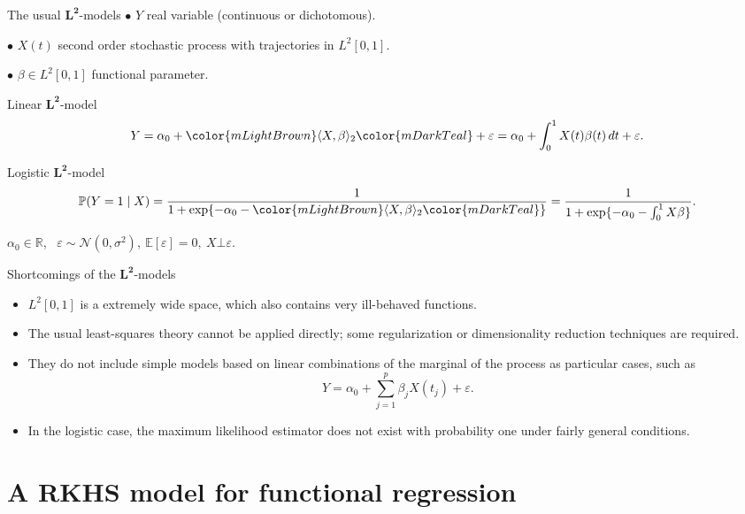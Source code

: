 \documentclass[10pt, english, professionalfonts]{beamer}
\newcommand\maroon[1]{\color{mLightBrown}#1\color{mDarkTeal}}
\begin{document}
\begin{frame}{The usual \(\bm{L^2}\)-models}
  \(\bullet\) \(Y\) real variable (continuous or dichotomous).

  \(\bullet\) \(X(t)\) second order stochastic process with trajectories in \(L^2[0, 1]\).

  \(\bullet\) \(\beta \in L^2[0,1]\) \maroon{functional parameter}.

  \vspace{1em}

\begin{block}{Linear \(\bm{L^2}\)-model}
  \[
    Y = \alpha_0 + \maroon{\langle X, \beta \rangle_2} + \varepsilon = \alpha_0 + \int_0^1 X(t)\beta(t)\, dt + \varepsilon.
  \]
\end{block}
\begin{block}{Logistic \(\bm{L^2}\)-model}
    \[
    \mathbb P (Y=1\mid X) = \frac{1}{1 + \exp\{-\alpha_0 - \maroon{\langle X, \beta\rangle_2}\}} = \frac{1}{1 + \exp\{-\alpha_0 - \int_0^1 X\beta\}}.
  \]
\end{block}
  \(\alpha_0\in\mathbb R\), \ \(\varepsilon \sim \mathcal N(0, \sigma^2), \ \mathbb E[\varepsilon]=0, \ X \bot \varepsilon\).
\end{frame}


\begin{frame}{Shortcomings of the \(\bm{L^2}\)-models}
  \begin{itemize}
    \item \(L^2[0, 1]\) is a extremely wide space, which also contains very ill-behaved functions.
    \item The usual least-squares theory cannot be applied directly; some regularization or dimensionality reduction techniques are required.
    \item They do not include simple models based on linear combinations of the marginal of the process as particular cases, such as
    \[
      Y = \alpha_0 + \sum_{j=1}^p \beta_j X(t_j) + \varepsilon.
    \]
    \item In the logistic case, the maximum likelihood estimator does not exist with probability one under fairly general conditions.
  \end{itemize}
\end{frame}

\section{A RKHS model for functional regression}
\end{document}
